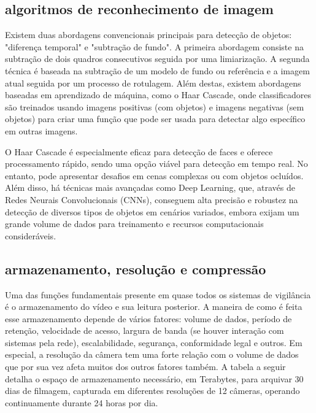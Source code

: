 \documentclass[12pt, %
openright, 
oneside, %
a4paper,    %
brazil]{facom-ufu-abntex2}
\begin{document}
\subsection{algoritmos de reconhecimento de imagem}

Existem duas abordagens convencionais principais para detecção de objetos:
"diferença temporal" e "subtração de fundo". A primeira abordagem consiste na
subtração de dois quadros consecutivos seguida por uma limiarização. A segunda
técnica é baseada na subtração de um modelo de fundo ou referência e a imagem
atual seguida por um processo de rotulagem. Além destas, existem abordagens
baseadas em aprendizado de máquina, como o Haar Cascade, onde classificadores
são treinados usando imagens positivas (com objetos) e imagens negativas (sem
objetos) para criar uma função que pode ser usada para detectar algo específico
em outras imagens. \cite{Valera2005IntelligentDS31}

O Haar Cascade é especialmente eficaz para detecção de faces e oferece
processamento rápido, sendo uma opção viável para detecção em tempo real. No
entanto, pode apresentar desafios em cenas complexas ou com objetos ocluídos.
Além disso, há técnicas mais avançadas como Deep Learning, que, através de
Redes Neurais Convolucionais (CNNs), conseguem alta precisão e robustez na detecção de diversos tipos de
objetos em cenários variados, embora exijam um grande volume de dados para
treinamento e recursos computacionais consideráveis. \cite{MLKHaarCascade2021}

\subsection{armazenamento, resolução e compressão}

Uma das funções fundamentais presente em quase todos os sistemas de vigilância
é o armazenamento do vídeo e sua leitura posterior. A maneira de como é feita
esse armazenamento depende de vários fatores: volume de dados, período de
retenção, velocidade de acesso, largura de banda (se houver interação com
sistemas pela rede), escalabilidade, segurança, conformidade legal e outros. Em
especial, a resolução da câmera tem uma forte relação com o volume de dados que
por sua vez afeta muitos dos outros fatores também. A tabela a seguir detalha o
espaço de armazenamento necessário, em Terabytes, para arquivar 30 dias de
filmagem, capturada em diferentes resoluções de 12 câmeras, operando
continuamente durante 24 horas por dia. %
\end{document}

